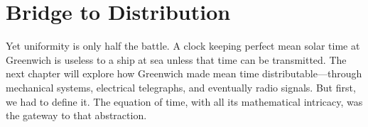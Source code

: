 \section{Bridge to Distribution}

Yet uniformity is only half the battle. A clock keeping perfect mean solar time at Greenwich is useless to a ship at sea unless that time can be transmitted. The next chapter will explore how Greenwich made mean time distributable—through mechanical systems, electrical telegraphs, and eventually radio signals. But first, we had to define it. The equation of time, with all its mathematical intricacy, was the gateway to that abstraction.


